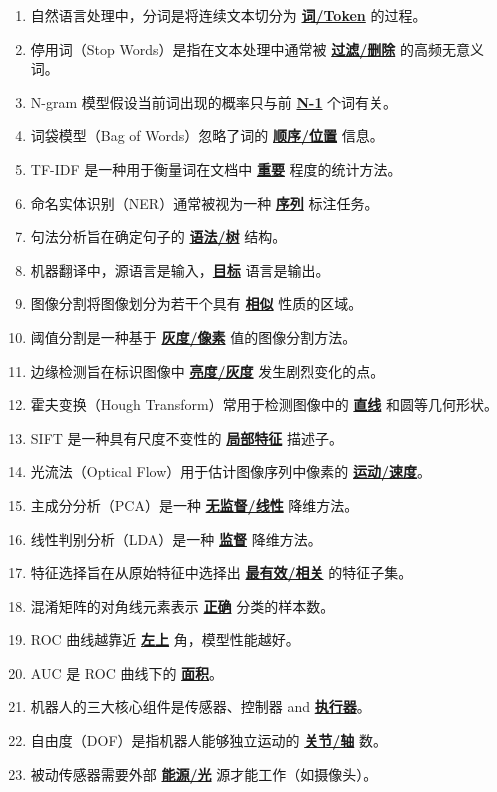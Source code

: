 \documentclass[12pt,a4paper,openany]{ctexbook}
\begin{document}
\begin{enumerate}[resume,leftmargin=2em,itemsep=1pt]
\item 自然语言处理中，分词是将连续文本切分为 \underline{\textbf{词/Token}} 的过程。
\item 停用词（Stop Words）是指在文本处理中通常被 \underline{\textbf{过滤/删除}} 的高频无意义词。
\item N-gram 模型假设当前词出现的概率只与前 \underline{\textbf{N-1}} 个词有关。
\item 词袋模型（Bag of Words）忽略了词的 \underline{\textbf{顺序/位置}} 信息。
\item TF-IDF 是一种用于衡量词在文档中 \underline{\textbf{重要}} 程度的统计方法。
\item 命名实体识别（NER）通常被视为一种 \underline{\textbf{序列}} 标注任务。
\item 句法分析旨在确定句子的 \underline{\textbf{语法/树}} 结构。
\item 机器翻译中，源语言是输入，\underline{\textbf{目标}} 语言是输出。
\item 图像分割将图像划分为若干个具有 \underline{\textbf{相似}} 性质的区域。
\item 阈值分割是一种基于 \underline{\textbf{灰度/像素}} 值的图像分割方法。
\item 边缘检测旨在标识图像中 \underline{\textbf{亮度/灰度}} 发生剧烈变化的点。
\item 霍夫变换（Hough Transform）常用于检测图像中的 \underline{\textbf{直线}} 和圆等几何形状。
\item SIFT 是一种具有尺度不变性的 \underline{\textbf{局部特征}} 描述子。
\item 光流法（Optical Flow）用于估计图像序列中像素的 \underline{\textbf{运动/速度}}。
\item 主成分分析（PCA）是一种 \underline{\textbf{无监督/线性}} 降维方法。
\item 线性判别分析（LDA）是一种 \underline{\textbf{监督}} 降维方法。
\item 特征选择旨在从原始特征中选择出 \underline{\textbf{最有效/相关}} 的特征子集。
\item 混淆矩阵的对角线元素表示 \underline{\textbf{正确}} 分类的样本数。
\item ROC 曲线越靠近 \underline{\textbf{左上}} 角，模型性能越好。
\item AUC 是 ROC 曲线下的 \underline{\textbf{面积}}。
\item 机器人的三大核心组件是传感器、控制器 and \underline{\textbf{执行器}}。
\item 自由度（DOF）是指机器人能够独立运动的 \underline{\textbf{关节/轴}} 数。
\item 被动传感器需要外部 \underline{\textbf{能源/光}} 源才能工作（如摄像头）。

\end{enumerate}
\end{document}
